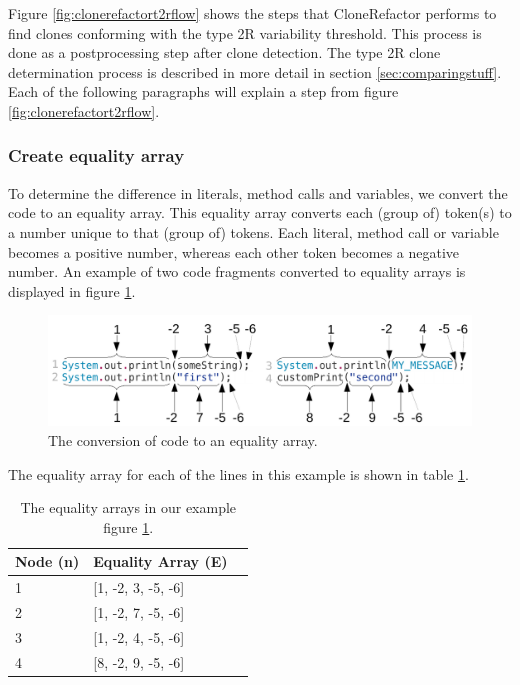 Figure \ref{fig:clonerefactort2rflow} shows the steps that CloneRefactor performs to find clones conforming with the type 2R variability threshold. This process is done as a postprocessing step after clone detection. The type 2R clone determination process is described in more detail in section \ref{sec:comparingstuff}. Each of the following paragraphs will explain a step from figure \ref{fig:clonerefactort2rflow}.

\subsubsection{Create equality array}
To determine the difference in literals, method calls and variables, we convert the code to an equality array. This equality array converts each (group of) token(s) to a number unique to that (group of) tokens. Each literal, method call or variable becomes a positive number, whereas each other token becomes a negative number. An example of two code fragments converted to equality arrays is displayed in figure \ref{fig:equalityarrays}.

\begin{figure}[H]
  \centering
  \includegraphics[width=1\columnwidth]{img/equality}
  \caption{The conversion of code to an equality array.}
  \label{fig:equalityarrays}
\end{figure}

The equality array for each of the lines in this example is shown in table \ref{table:equalityarrays}.

\begin{table}[H]
\begin{center}
 \caption{The equality arrays in our example figure \ref{fig:equalityarrays}.} \label{table:equalityarrays}
 \medskip
\begin{tabular}{|l|l|l|}
\hline
Node (n) & Equality Array (E) \\ \hline
1        & {[}1, -2, 3, -5, -6{]} \\ \hline
2        & {[}1, -2, 7, -5, -6{]} \\ \hline
3        & {[}1, -2, 4, -5, -6{]} \\ \hline
4        & {[}8, -2, 9, -5, -6{]} \\ \hline
\end{tabular}
\end{center}
\end{table}

